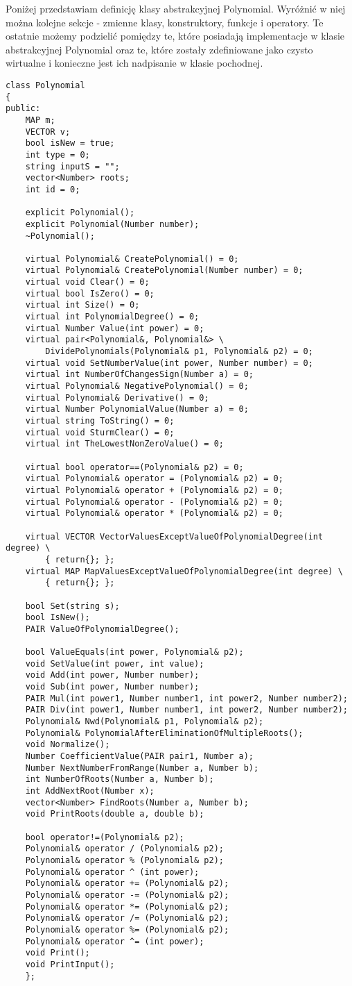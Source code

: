 \documentclass[twoside,a4paper]{book}
\begin{document}
Poniżej przedstawiam definicję klasy abstrakcyjnej Polynomial. Wyróżnić w niej można kolejne sekcje - zmienne klasy, konstruktory, funkcje i operatory. Te ostatnie możemy podzielić pomiędzy te, które posiadają implementacje w klasie abstrakcyjnej Polynomial oraz te, które zostały zdefiniowane jako czysto wirtualne i konieczne jest ich nadpisanie w klasie pochodnej.

\begin{lstlisting}
class Polynomial
{
public:
	MAP m;
	VECTOR v;
	bool isNew = true;
	int type = 0;
	string inputS = "";
	vector<Number> roots;
	int id = 0;
	
	explicit Polynomial();
	explicit Polynomial(Number number);
	~Polynomial();
	
	virtual Polynomial& CreatePolynomial() = 0;
	virtual Polynomial& CreatePolynomial(Number number) = 0;
	virtual void Clear() = 0;
	virtual bool IsZero() = 0;
	virtual int Size() = 0;
	virtual int PolynomialDegree() = 0;
	virtual Number Value(int power) = 0;
	virtual pair<Polynomial&, Polynomial&> \
		DividePolynomials(Polynomial& p1, Polynomial& p2) = 0;
	virtual void SetNumberValue(int power, Number number) = 0;
	virtual int NumberOfChangesSign(Number a) = 0;
	virtual Polynomial& NegativePolynomial() = 0;
	virtual Polynomial& Derivative() = 0;
	virtual Number PolynomialValue(Number a) = 0;
	virtual string ToString() = 0;
	virtual void SturmClear() = 0;
	virtual int TheLowestNonZeroValue() = 0;
	
	virtual bool operator==(Polynomial& p2) = 0;
	virtual Polynomial& operator = (Polynomial& p2) = 0;
	virtual Polynomial& operator + (Polynomial& p2) = 0;
	virtual Polynomial& operator - (Polynomial& p2) = 0;
	virtual Polynomial& operator * (Polynomial& p2) = 0;
	
	virtual VECTOR VectorValuesExceptValueOfPolynomialDegree(int degree) \
		{ return{}; };
	virtual MAP MapValuesExceptValueOfPolynomialDegree(int degree) \
		{ return{}; };
	
	bool Set(string s);
	bool IsNew();
	PAIR ValueOfPolynomialDegree();
	
	bool ValueEquals(int power, Polynomial& p2);
	void SetValue(int power, int value);
	void Add(int power, Number number);
	void Sub(int power, Number number);
	PAIR Mul(int power1, Number number1, int power2, Number number2);
	PAIR Div(int power1, Number number1, int power2, Number number2);
	Polynomial& Nwd(Polynomial& p1, Polynomial& p2);
	Polynomial& PolynomialAfterEliminationOfMultipleRoots();
	void Normalize();
	Number CoefficientValue(PAIR pair1, Number a);
	Number NextNumberFromRange(Number a, Number b);
	int NumberOfRoots(Number a, Number b);
	int AddNextRoot(Number x);
	vector<Number> FindRoots(Number a, Number b);
	void PrintRoots(double a, double b);
	
	bool operator!=(Polynomial& p2);
	Polynomial& operator / (Polynomial& p2);
	Polynomial& operator % (Polynomial& p2);
	Polynomial& operator ^ (int power);
	Polynomial& operator += (Polynomial& p2);
	Polynomial& operator -= (Polynomial& p2);
	Polynomial& operator *= (Polynomial& p2);
	Polynomial& operator /= (Polynomial& p2);
	Polynomial& operator %= (Polynomial& p2);
	Polynomial& operator ^= (int power);
	void Print();
	void PrintInput();
	};
\end{lstlisting}
\end{document}
